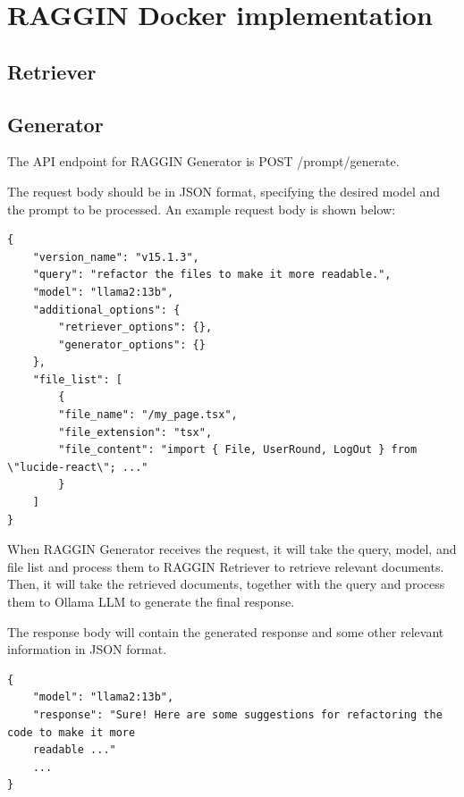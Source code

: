 \section{RAGGIN Docker implementation}

\subsection{Retriever}

\subsection{Generator}

The API endpoint for RAGGIN Generator is POST /prompt/generate.

The request body should be in JSON format, specifying the desired model and the prompt to be processed. An example request body is shown below:

\begin{verbatim}
{
    "version_name": "v15.1.3",
    "query": "refactor the files to make it more readable.",
    "model": "llama2:13b",
    "additional_options": {
        "retriever_options": {},
        "generator_options": {}
    },
    "file_list": [
        {
        "file_name": "/my_page.tsx",
        "file_extension": "tsx",
        "file_content": "import { File, UserRound, LogOut } from \"lucide-react\"; ..."
        }
    ]
}
\end{verbatim}

When RAGGIN Generator receives the request, it will take the query, model, and file list and process them to RAGGIN Retriever to retrieve relevant documents. Then, it will take the retrieved documents, together with the query and process them to Ollama LLM to generate the final response.

The response body will contain the generated response and some other relevant information in JSON format.

\begin{verbatim}
{
    "model": "llama2:13b",
    "response": "Sure! Here are some suggestions for refactoring the code to make it more 
    readable ..."
    ...
}
\end{verbatim}
